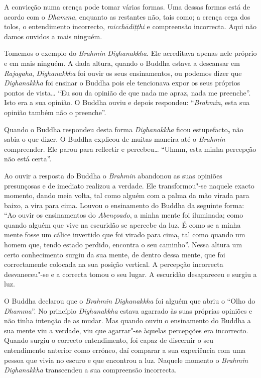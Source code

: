 A convicção numa crença pode tomar várias formas. Uma dessas formas está
de acordo com o \emph{Dhamma}, enquanto as restantes não, tais como; a
crença cega dos tolos, o entendimento incorrecto, \emph{micchādiṭṭhi} e
compreensão incorrecta. Aqui não damos ouvidos a mais ninguém.

Tomemos o exemplo do \emph{Brahmin} \emph{Dighanakkha}. Ele acreditava
apenas nele próprio e em mais ninguém. A dada altura, quando o Buddha
estava a descansar em \emph{Rajagaha}, \emph{Dighanakkha} foi ouvir os
seus ensinamentos, ou podemos dizer que \emph{Dighanakkha} foi ensinar o
Buddha pois ele tencionava expor os seus próprios pontos de
vista\ldots{} ``Eu sou da opinião de que nada me apraz, nada me
preenche''. Isto era a sua opinião. O Buddha ouviu e depois respondeu:
``\emph{Brahmin}, esta sua opinião também não o preenche''.

Quando o Buddha respondeu desta forma \emph{Dighanakkha} ficou
estupefacto\textbf{,} não sabia o que dizer. O Buddha explicou de muitas
maneira até o \emph{Brahmin} compreender. Ele parou para reflectir e
percebeu\ldots{} ``Uhmm, esta minha percepção não está certa''.

Ao ouvir a resposta do Buddha o \emph{Brahmin} abandonou as suas
opiniões presunçosas e de imediato realizou a verdade. Ele
transformou"-se naquele exacto momento, dando meia volta, tal como alguém
com a palma da mão virada para baixo, a vira para cima. Louvou o
ensinamento do Buddha da seguinte forma: ``Ao ouvir os ensinamentos do
\emph{Abençoado}, a minha mente foi iluminada; como quando alguém que
vive na escuridão se apercebe da luz. É como se a minha mente fosse um
cálice invertido que foi virado para cima, tal como quando um homem que,
tendo estado perdido, encontra o seu caminho''. Nessa altura um certo
conhecimento surgiu da sua mente, de dentro dessa mente, que foi
correctamente colocada na sua posição vertical. A percepção incorrecta
desvaneceu"-se e a correcta tomou o seu lugar. A escuridão desapareceu e
surgiu a luz.

O Buddha declarou que o \emph{Brahmin} \emph{Dighanakkha} foi alguém que
abriu o ``Olho do \emph{Dhamma}''. No princípio \emph{Dighanakkha}
estava agarrado às suas próprias opiniões e não tinha intenção de as
mudar. Mas quando ouviu o ensinamento do Buddha a sua mente viu a
verdade, viu que agarrar"-se àquelas percepções era incorrecto. Quando
surgiu o correcto entendimento, foi capaz de discernir o seu
entendimento anterior como erróneo, daí comparar a sua experiência com
uma pessoa que vivia no escuro e que encontrou a luz. Naquele momento o
\emph{Brahmin} \emph{Dighanakkha} transcendeu a sua compreensão
incorrecta.

